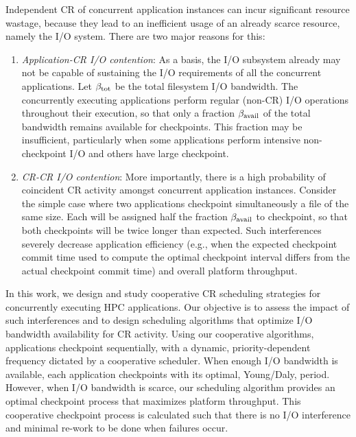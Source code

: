 Independent CR of concurrent application instances can incur significant resource
wastage, because they lead to an inefficient usage of an already scarce resource,
namely the I/O system.  There are two major reasons for this:
\begin{enumerate}
\item \emph{Application-CR I/O contention}: As a basis, the I/O subsystem already may
  not be capable of sustaining the I/O requirements of all the concurrent
  applications.  Let $\beta_{\text{tot}}$ be the total filesystem I/O bandwidth.  The
  concurrently executing applications perform regular (non-CR) I/O operations
  throughout their execution, so that only a fraction $\beta_{\text{avail}}$ of the total
  bandwidth remains available for checkpoints.  This fraction may be insufficient,
  particularly when some applications perform intensive non-checkpoint I/O and others
  have large checkpoint.

\item \emph{CR-CR I/O contention}: More importantly, there is a high probability of
  coincident CR activity amongst concurrent application instances.
  Consider the simple case where two applications checkpoint simultaneously a file of
  the same size. Each will be assigned half the fraction $\beta_{\text{avail}}$ to checkpoint,
  so that both checkpoints will be twice longer than expected. Such interferences
  severely decrease application efficiency (e.g., when the expected checkpoint commit
  time used to compute the optimal checkpoint interval differs from the actual
  checkpoint commit time) and overall platform throughput.
\end{enumerate}

In this work, we design and study cooperative CR scheduling strategies for concurrently
executing HPC applications.  Our objective is to assess the impact of such
interferences and to design scheduling algorithms that optimize I/O bandwidth
availability for CR activity.  Using our cooperative algorithms, applications checkpoint
sequentially, with a dynamic, priority-dependent frequency dictated by a cooperative
scheduler.  When enough I/O bandwidth is available, each application checkpoints with
its optimal, Young/Daly, period. However, when I/O bandwidth is scarce, our
scheduling algorithm provides an optimal checkpoint process that maximizes platform
throughput. This cooperative checkpoint process is calculated such that there is no
I/O interference and minimal re-work to be done when failures occur.

